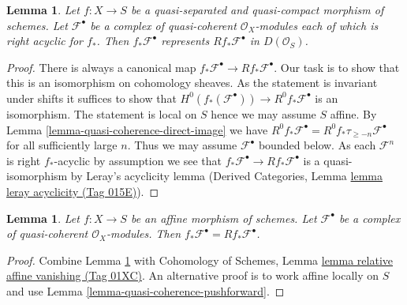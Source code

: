 \documentclass{amsart}
\theoremstyle{plain}
\newtheorem{lemma}[subsection]{Lemma}
\theoremstyle{definition}
\theoremstyle{remark}
\numberwithin{equation}{subsection}
\begin{document}
\begin{lemma}
\label{lemma-acyclicity-lemma}
Let $f : X \to S$ be a quasi-separated and quasi-compact morphism
of schemes. Let $\mathcal{F}^\bullet$ be a complex of quasi-coherent
$\mathcal{O}_X$-modules each of which is right acyclic for $f_*$.
Then $f_*\mathcal{F}^\bullet$ represents $Rf_*\mathcal{F}^\bullet$
in $D(\mathcal{O}_S)$.
\end{lemma}

\begin{proof}
There is always a canonical map
$f_*\mathcal{F}^\bullet \to Rf_*\mathcal{F}^\bullet$.
Our task is to show that this is an isomorphism on cohomology sheaves.
As the statement is invariant under shifts it suffices to show that
$H^0(f_*(\mathcal{F}^\bullet)) \to R^0f_*\mathcal{F}^\bullet$
is an isomorphism. The statement is local on $S$ hence we
may assume $S$ affine. By
Lemma \ref{lemma-quasi-coherence-direct-image}
we have $R^0f_*\mathcal{F}^\bullet = R^0f_*\tau_{\geq -n}\mathcal{F}^\bullet$
for all sufficiently large $n$. Thus we may assume $\mathcal{F}^\bullet$
bounded below. As each $\mathcal{F}^n$ is right $f_*$-acyclic by
assumption we see that $f_*\mathcal{F}^\bullet \to Rf_*\mathcal{F}^\bullet$
is a quasi-isomorphism by Leray's acyclicity lemma (Derived Categories, Lemma
\href{https://stacks.math.columbia.edu/tag/015E}{lemma leray acyclicity (Tag 015E)}).
\end{proof}


\begin{lemma}
\label{lemma-pushforward-affine-morphism}
Let $f : X \to S$ be an affine morphism of schemes. Let $\mathcal{F}^\bullet$
be a complex of quasi-coherent $\mathcal{O}_X$-modules. Then
$f_*\mathcal{F}^\bullet = Rf_*\mathcal{F}^\bullet$.
\end{lemma}

\begin{proof}
Combine Lemma \ref{lemma-acyclicity-lemma} with
Cohomology of Schemes, Lemma \href{https://stacks.math.columbia.edu/tag/01XC}{lemma relative affine vanishing (Tag 01XC)}.
An alternative proof is to work affine locally on $S$
and use Lemma \ref{lemma-quasi-coherence-pushforward}.
\end{proof}
\end{document}
